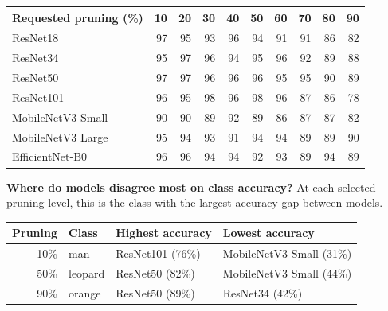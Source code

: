 \begin{center}\small\setlength{\tabcolsep}{4.2pt}
\begin{tabular}{@{}lrrrrrrrrr@{}}\toprule
Requested pruning (\%) & 10 & 20 & 30 & 40 & 50 & 60 & 70 & 80 & 90 \\ \midrule
ResNet18 & \cellcolor{teal!63}97 & \cellcolor{teal!61}95 & \cellcolor{teal!60}93 & \cellcolor{teal!62}96 & \cellcolor{teal!61}94 & \cellcolor{teal!59}91 & \cellcolor{teal!59}91 & \cellcolor{teal!55}86 & \cellcolor{teal!53}82 \\
ResNet34 & \cellcolor{teal!61}95 & \cellcolor{teal!63}97 & \cellcolor{teal!62}96 & \cellcolor{teal!61}94 & \cellcolor{teal!61}95 & \cellcolor{teal!62}96 & \cellcolor{teal!59}92 & \cellcolor{teal!57}89 & \cellcolor{teal!57}88 \\
ResNet50 & \cellcolor{teal!63}97 & \cellcolor{teal!63}97 & \cellcolor{teal!62}96 & \cellcolor{teal!62}96 & \cellcolor{teal!62}96 & \cellcolor{teal!61}95 & \cellcolor{teal!61}95 & \cellcolor{teal!58}90 & \cellcolor{teal!57}89 \\
ResNet101 & \cellcolor{teal!62}96 & \cellcolor{teal!61}95 & \cellcolor{teal!63}98 & \cellcolor{teal!62}96 & \cellcolor{teal!63}98 & \cellcolor{teal!62}96 & \cellcolor{teal!56}87 & \cellcolor{teal!55}86 & \cellcolor{teal!50}78 \\
MobileNetV3 Small & \cellcolor{teal!58}90 & \cellcolor{teal!58}90 & \cellcolor{teal!57}89 & \cellcolor{teal!59}92 & \cellcolor{teal!57}89 & \cellcolor{teal!55}86 & \cellcolor{teal!56}87 & \cellcolor{teal!56}87 & \cellcolor{teal!53}82 \\
MobileNetV3 Large & \cellcolor{teal!61}95 & \cellcolor{teal!61}94 & \cellcolor{teal!60}93 & \cellcolor{teal!59}91 & \cellcolor{teal!61}94 & \cellcolor{teal!61}94 & \cellcolor{teal!57}89 & \cellcolor{teal!57}89 & \cellcolor{teal!58}90 \\
EfficientNet-B0 & \cellcolor{teal!62}96 & \cellcolor{teal!62}96 & \cellcolor{teal!61}94 & \cellcolor{teal!61}94 & \cellcolor{teal!59}92 & \cellcolor{teal!60}93 & \cellcolor{teal!57}89 & \cellcolor{teal!61}94 & \cellcolor{teal!57}89 \\
\bottomrule\end{tabular}
\end{center}
\textbf{Where do models disagree most on class accuracy?} At each selected pruning level, this is the class with the largest accuracy gap between models.
\begin{center}\small\begin{tabularx}{\linewidth}{@{}rlXX@{}}\toprule
Pruning & Class & Highest accuracy & Lowest accuracy \\ \midrule
10\% & man & ResNet101 (76\%) & MobileNetV3 Small (31\%) \\
50\% & leopard & ResNet50 (82\%) & MobileNetV3 Small (44\%) \\
90\% & orange & ResNet50 (89\%) & ResNet34 (42\%) \\
\bottomrule\end{tabularx}\end{center}
